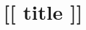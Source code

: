 \documentclass[10pt,twocolumn,lettersize]{book}
\begin{document}
\chapter*{[[ title ]]}
\end{document}
